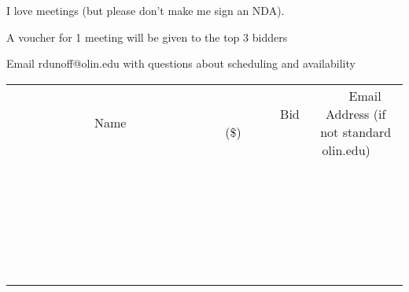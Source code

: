\documentclass[11pt]{article}
\begin{document}
I love meetings (but please don't make me sign an NDA). 

A voucher for 1 meeting will be given to the top 3 bidders

Email rdunoff@olin.edu with questions about scheduling and availability \\
					[6ex]
					\begin{tabular}{c c c}
						~~~~~~~~~~~~~Name~~~~~~~~~~~~~ & ~~~~~~~~~Bid (\$)~~~~~~~~~ & ~~~Email Address (if not standard olin.edu)~~~ \\
				
 & & \\
\hline
 & & \\
\hline
 & & \\
\hline
 & & \\
\hline
 & & \\
\hline
 & & \\
\hline
 & & \\
\hline
 & & \\
\hline
 & & \\
\hline
 & & \\
\hline
 & & \\
\hline
 & & \\
\hline
 & & \\
\hline
 & & \\
\hline
 & & \\
\hline
 & & \\
\hline
 & & \\
\hline
 & & \\
\hline
 & & \\
\hline
 & & \\
\hline
 & & \\
\hline
 & & \\
\hline
 & & \\
\hline
 & & \\
\hline
 & & \\
\hline
 & & \\
\hline
					\end{tabular}
					\clearpage
				
\end{document}
